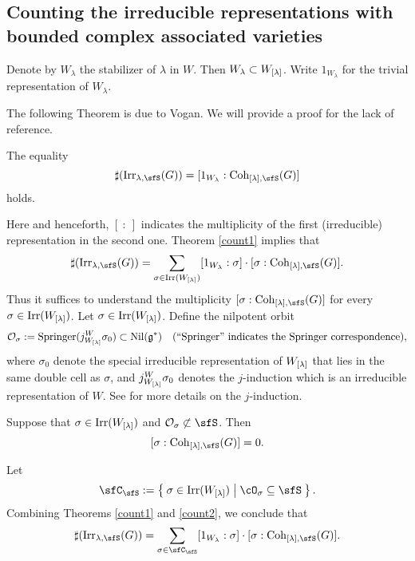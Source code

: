 \documentclass[counting_main.tex]{subfiles}
\begin{document}
\subsection{Counting the irreducible representations with bounded complex
  associated varieties}

Denote by $W_\lambda$ the stabilizer of
$\lambda$ in $W$. Then $W_\lambda\subset W_{[\lambda]}$. Write $1_{W_\lambda}$ for the
trivial representation of $W_{\lambda}$.

The following Theorem is due to Vogan. We will provide a proof for the lack of
reference.
\begin{thm}[Vogan]\label{count1} 
  The equality
  \[
    \sharp(\Irr_{\lambda,\sfS}(G)) = [1_{W_{\lambda}}:\Coh_{\Lam,\sfS}(G)]
  \]
  holds.
\end{thm}
Here and henceforth, $[\ : \ ]$ indicates the multiplicity of the first
(irreducible) representation in the second one. Theorem \ref{count1} implies
that
\begin{equation}\label{countlg}
  \sharp(\Irr_{\lambda,\sfS}(G)) = \sum_{\sigma\in \Irr(W_\Lam)} [1_{W_{\lambda}}: \sigma]\cdot [\sigma: \Coh_{\Lam,\sfS}(G)].
\end{equation}
Thus it suffices to understand the multiplicity $ [\sigma: \Coh_{\Lam,\sfS}(G)]$
for every $\sigma\in \mathrm{Irr}(W_{[\lambda]})$. Let $\sigma\in \mathrm{Irr}(W_{[\lambda]})$. Define the
nilpotent orbit
\[
  {\mathcal {O}}_\sigma:=\mathrm{Springer}(j_{W_{[\lambda]}}^W \sigma_0)\subset \mathrm{Nil}(\mathfrak g^*) \quad (``\mathrm{Springer}"\textrm{
    indicates the Springer correspondence}),
\]
where $\sigma_0$ denote the special irreducible representation of $W_{[\lambda]}$ that
lies in the same double cell as $\sigma$, and $j_{W_{[\lambda]}}^W \sigma_0$ denotes
the $j$-induction which is an irreducible representation of $W$. See \cite[Chapter 11]{Carter} for more details on the $j$-induction. 


\begin{prop}\label{count2}
  Suppose that $\sigma\in \mathrm{Irr}(W_{[\lambda]})$ and $\CO_\sigma\nsubset \sfS$. Then
  \[
    [\sigma: \Coh_{\Lam,\sfS}(G)]=0.
  \]

\end{prop}


Let
\[
  \sfC_{\sfS}:= \Set{\sigma\in \Irr(\WLam)| \cO_{\sigma}\subseteq \sfS}.
\]
Combining Theorems \ref{count1} and \ref{count2}, we conclude that
\begin{equation}\label{leq2}
  \sharp(\Irr_{\lambda,\sfS}(G)) = \sum_{\sigma \in \sfC_{\sfS}} [1_{W_{\lambda}}: \sigma]\cdot [\sigma: \Coh_{\Lam,\sfS}(G)].
\end{equation}
\end{document}
